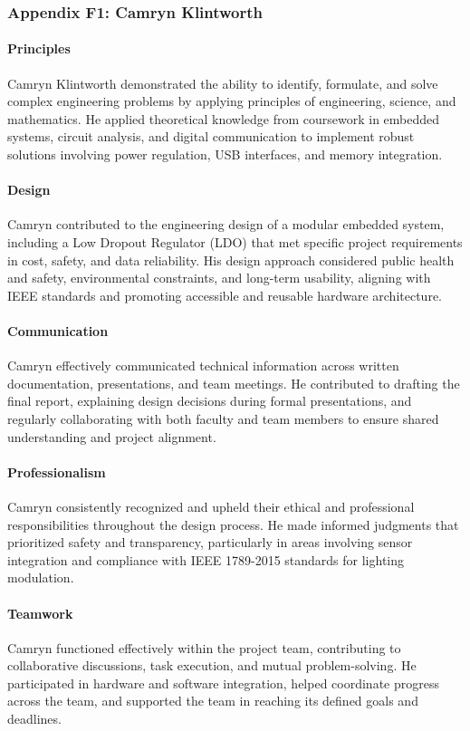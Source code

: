 \documentclass[../../main.tex]{subfiles}
\begin{document}
\subsubsection{Appendix F1: Camryn Klintworth}

\paragraph{Principles}
Camryn Klintworth demonstrated the ability to identify, formulate, and solve complex engineering problems by applying principles of engineering, science, and mathematics. He applied theoretical knowledge from coursework in embedded systems, circuit analysis, and digital communication to implement robust solutions involving power regulation, USB interfaces, and memory integration.

\paragraph{Design}
Camryn contributed to the engineering design of a modular embedded system, including a Low Dropout Regulator (LDO) that met specific project requirements in cost, safety, and data reliability. His design approach considered public health and safety, environmental constraints, and long-term usability, aligning with IEEE standards and promoting accessible and reusable hardware architecture.

\paragraph{Communication}
Camryn effectively communicated technical information across written documentation, presentations, and team meetings. He contributed to drafting the final report, explaining design decisions during formal presentations, and regularly collaborating with both faculty and team members to ensure shared understanding and project alignment.

\paragraph{Professionalism}
Camryn consistently recognized and upheld their ethical and professional responsibilities throughout the design process. He made informed judgments that prioritized safety and transparency, particularly in areas involving sensor integration and compliance with IEEE 1789-2015 standards for lighting modulation.

\paragraph{Teamwork}
Camryn functioned effectively within the project team, contributing to collaborative discussions, task execution, and mutual problem-solving. He participated in hardware and software integration, helped coordinate progress across the team, and supported the team in reaching its defined goals and deadlines.
\end{document}
